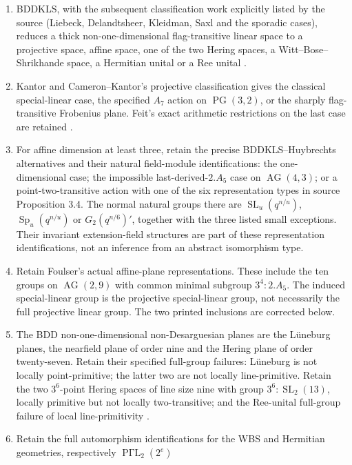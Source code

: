 \documentclass[11pt,a4paper]{article}
\begin{document}
\begin{enumerate}
\item BDDKLS, with the subsequent classification work explicitly listed
by the source (Liebeck, Delandtsheer, Kleidman, Saxl and the sporadic
cases), reduces a thick non-one-dimensional flag-transitive linear
space to a projective space, affine space, one of the two Hering spaces,
a Witt--Bose--Shrikhande space, a Hermitian unital or a Ree unital
\cite[Proposition 1.1 and its attribution]{BDL}.
\item Kantor and Cameron--Kantor's projective classification gives the
classical special-linear case, the specified $A_7$ action on
$\operatorname{PG}(3,2)$, or the sharply flag-transitive Frobenius
plane. Feit's exact arithmetic restrictions on the last case are
retained \cite[Propositions 3.1--3.2]{BDL}.
\item For affine dimension at least three, retain the precise
BDDKLS--Huybrechts alternatives and their natural field-module
identifications: the one-dimensional case; the impossible
last-derived-$2.A_5$ case on $\operatorname{AG}(4,3)$; or a
point-two-transitive action with one of the six representation types
in source Proposition 3.4. The normal natural groups there are
$\operatorname{SL}_u(q^{n/u})$, $\operatorname{Sp}_u(q^{n/u})$
or $G_2(q^{n/6})'$, together with the three listed small exceptions.
Their invariant extension-field structures are part of these
representation identifications, not an inference from an abstract
isomorphism type.
\item Retain Foulser's actual affine-plane representations. These include
the ten groups on $\operatorname{AG}(2,9)$ with common minimal
subgroup $3^4:2.A_5$. The induced special-linear group is the projective special-linear group,
not necessarily the full projective linear group. The two printed
inclusions are corrected below.
\item The BDD non-one-dimensional non-Desarguesian planes are the
L\"uneburg planes, the nearfield plane of order nine and the Hering
plane of order twenty-seven. Retain their specified full-group failures:
L\"uneburg is not locally point-primitive; the latter two are not
locally line-primitive. Retain the two $3^6$-point Hering spaces of
line size nine with group $3^6:\operatorname{SL}_2(13)$, locally
primitive but not locally two-transitive; and the Ree-unital full-group
failure of local line-primitivity \cite[\S\S3.2.2, 3.3, 3.6]{BDL}.
\item Retain the full automorphism identifications for the WBS and
Hermitian geometries, respectively $\operatorname{P\Gamma L}_2(2^e)$

\end{enumerate}
\end{document}
